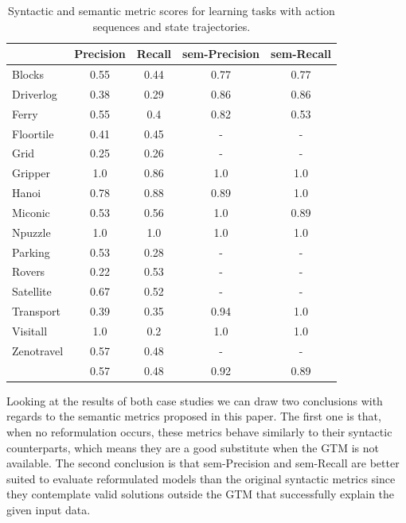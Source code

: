 \begin{table}[hbt!]
    \begin{footnotesize}
	\begin{center}		
		\begin{tabular}{l|c|c|c|c|}		
			& {\bf Precision} & {\bf Recall} & {\bf sem-Precision} & {\bf sem-Recall} \\
			\hline
			Blocks & 0.55 & 0.44 & 0.77 & 0.77 \\
			Driverlog & 0.38 & 0.29 & 0.86 & 0.86 \\
			Ferry & 0.55 & 0.4 & 0.82 & 0.53 \\
			Floortile & 0.41 & 0.45 & - & - \\
			Grid & 0.25 & 0.26 & - & - \\
			Gripper & 1.0 & 0.86 & 1.0 & 1.0 \\
			Hanoi & 0.78 & 0.88 & 0.89 & 1.0 \\
			Miconic & 0.53 & 0.56 & 1.0 & 0.89 \\
			Npuzzle & 1.0 & 1.0 & 1.0 & 1.0 \\
			Parking & 0.53 & 0.28 & - & - \\
			Rovers & 0.22 & 0.53 & - & - \\
			Satellite & 0.67 & 0.52 & - & - \\
			Transport & 0.39 & 0.35 & 0.94 & 1.0 \\
			Visitall & 1.0 & 0.2 & 1.0 & 1.0 \\
			Zenotravel & 0.57 & 0.48 & - & - \\
			\hline
			& 0.57 & 0.48 & 0.92 & 0.89
		\end{tabular}
	\end{center}
    \end{footnotesize}
	\caption{\small Syntactic and semantic metric scores for learning tasks with \NO action sequences and \NO state trajectories.}
	\label{tab:metric_comparison_0_0}
\end{table}

Looking at the results of both case studies we can draw two conclusions with regards to the semantic metrics proposed in this paper. The first one is that, when no reformulation occurs, these metrics behave similarly to their syntactic counterparts, which means they are a good substitute when the GTM is not available. The second conclusion is that sem-Precision and sem-Recall are better suited to evaluate reformulated models than the original syntactic metrics since they contemplate valid solutions outside the GTM that successfully explain the given input data.
